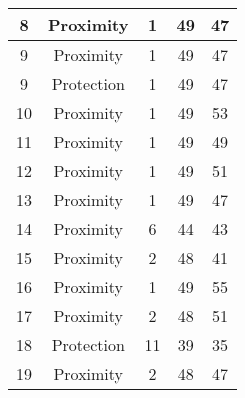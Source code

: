\documentclass[results.tex]{subfiles}
\begin{document}
\begin{center}
\begin{tabular}{| c || c | c | c | c |}
            \hline
            8                       & Proximity                    & 1                      & 49                      & 47                   \\
            \hline
            9                       & Proximity                    & 1                      & 49                      & 47                   \\
            \hline
            9                       & Protection                   & 1                      & 49                      & 47                   \\
            \hline
            10                      & Proximity                    & 1                      & 49                      & 53                   \\
            \hline
            11                      & Proximity                    & 1                      & 49                      & 49                   \\
            \hline
            12                      & Proximity                    & 1                      & 49                      & 51                   \\
            \hline
            13                      & Proximity                    & 1                      & 49                      & 47                   \\
            \hline
            14                      & Proximity                    & 6                      & 44                      & 43                   \\
            \hline
            15                      & Proximity                    & 2                      & 48                      & 41                   \\
            \hline
            16                      & Proximity                    & 1                      & 49                      & 55                   \\
            \hline
            17                      & Proximity                    & 2                      & 48                      & 51                   \\
            \hline
            18                      & Protection                   & 11                     & 39                      & 35                   \\
            \hline
            19                      & Proximity                    & 2                      & 48                      & 47                   \\

\end{tabular}
\end{center}
\end{document}
